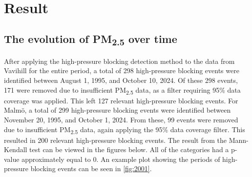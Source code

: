 \newpage
\section{Result}
\subsection{The evolution of \texorpdfstring{PM\textsubscript{2.5}}{PM2.5} over time}

After applying the high-pressure blocking detection method to the data from Vavihill for the entire period, a total of 298 high-pressure blocking events were identified between August 1, 1995, and October 10, 2024. Of these 298 events, 171 were removed due to insufficient PM\textsubscript{2.5} data, as a filter requiring 95\% data coverage was applied. This left 127 relevant high-pressure blocking events. For Malmö, a total of 299 high-pressure blocking events were identified between November 20, 1995, and October 1, 2024. From these, 99 events were removed due to insufficient PM\textsubscript{2.5} data, again applying the 95\% data coverage filter. This resulted in 200 relevant high-pressure blocking events. The result from the Mann-Kendall test can be viewed in the figures below. All of the categories had a p-value approximately equal to 0. An example plot showing the periods of high-pressure blocking events can be seen in \autoref{fig:2001}.


